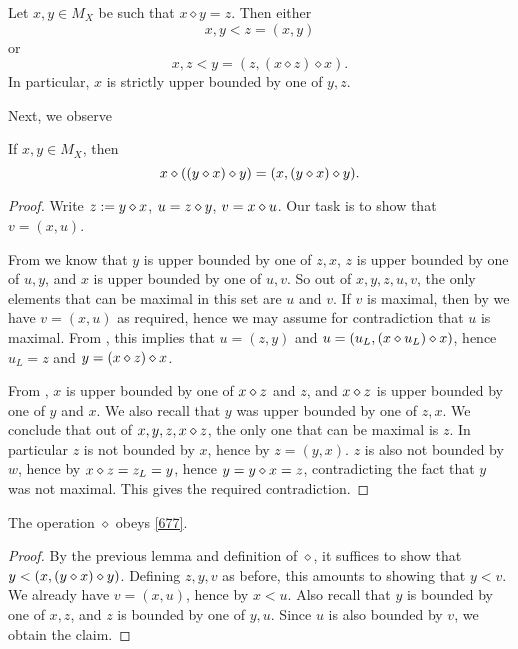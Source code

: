 \begin{lemma}\label{op-prop}  Let $x,y \in M_X$ be such that $x \diamond y = z$.  Then either
$$ x, y < z = (x,y)$$
or
$$ x, z < y = (z, (x \diamond z) \diamond x).$$
In particular, $x$ is strictly upper bounded by one of $y,z$.
\end{lemma}

Next, we observe

\begin{lemma}\label{op-2}  If $x,y \in M_X$, then
  $$ x \diamond ((y \diamond x) \diamond y) = (x, (y \diamond x) \diamond y).$$
\end{lemma}

\begin{proof} Write $z := y \diamond x$, $u = z \diamond y$, $v = x \diamond u$.  Our task is to show that $v = (x,u)$.

From  we know that $y$ is upper bounded by one of $z,x$, $z$ is upper bounded by one of $u,y$, and $x$ is upper bounded by one of $u,v$.  So out of $x,y,z,u,v$, the only elements that can be maximal in this set are $u$ and $v$.  If $v$ is maximal, then by  we have $v = (x,u)$ as required, hence we may assume for contradiction that $u$ is maximal.  From , this implies that $u = (z,y)$ and $u = (u_L, (x \diamond u_L) \diamond x)$, hence $u_L = z$ and $y = (x \diamond z) \diamond x$.

From , $x$ is upper bounded by one of $x \diamond z$ and $z$, and $x \diamond z$ is upper bounded by one of $y$ and $x$.  We also recall that $y$ was upper bounded by one of $z,x$. We conclude that out of $x,y,z,x \diamond z$, the only one that can be maximal is $z$.  In particular $z$ is not bounded by $x$, hence by  $z = (y,x)$.  $z$ is also not bounded by $w$, hence by  $x \diamond z = z_L = y$, hence $y = y \diamond x = z$, contradicting the fact that $y$ was not maximal. This gives the required contradiction.
\end{proof}

\begin{corollary}\label{677-obey}  The operation $\diamond$ obeys \eqref{677}.
\end{corollary}

\begin{proof} By the previous lemma and definition of $\diamond$, it suffices to show that $y < (x, (y \diamond x) \diamond y)$.  Defining $z,y,v$ as before, this amounts to showing that $y < v$.  We already have $v = (x,u)$, hence by  $x < u$.  Also recall that $y$ is bounded by one of $x,z$, and $z$ is bounded by one of $y,u$.  Since $u$ is also bounded by $v$, we obtain the claim.
\end{proof}

